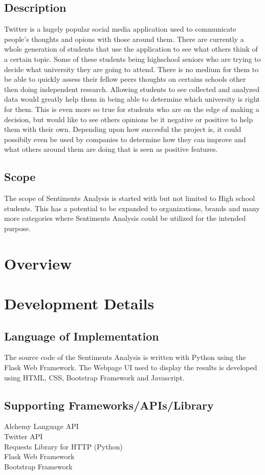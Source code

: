 \documentclass[12pt, titlepage]{article}
\begin{document}
\subsection{Description}
Twitter is a hugely popular social media application used to communicate people's thoughts
and opions with those around them. There are currently a whole generation of students that
use the application to see what others think of a certain topic. Some of these students being
highschool seniors who are trying to decide what university they are going to attend. There
is no medium for them to be able to quickly assess their fellow peers thoughts on certains
schools other then doing independent research.
Allowing students to see collected and analyzed data would greatly help them in being able
to determine which university is right for them. This is even more so true for students who
are on the edge of making a decision, but would like to see others opinions be it negative or
positive to help them with their own. Depending upon how succesful the project is, it could
possibily even be used by companies to determine how they can improve and what others
around them are doing that is seen as positive features.

\subsection{Scope}
The scope of Sentiments Analysis is started with but not limited to High school students. This has a potential to be expanded to organizations, brands and many more categories where Sentiments Analysis could be utilized for the intended purpose.

\newpage
\section{Overview}

\section{Development Details}
\subsection{Language of Implementation}
The source code of the Sentiments Analysis is written with Python using the Flask Web Framework. The Webpage UI used to display the results is developed using HTML, CSS, Bootstrap Framework and Javascript.

\subsection{Supporting Frameworks/APIs/Library}
Alchemy Language API\\
Twitter API\\
Requests Library for HTTP (Python)\\
Flask Web Framework\\
Bootstrap Framework
\end{document}

